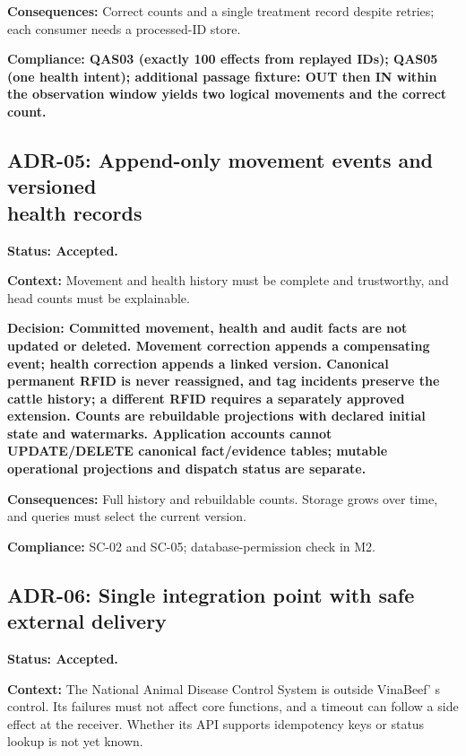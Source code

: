 \textbf{Consequences:} Correct counts and a single treatment record
despite retries; each consumer needs a processed-ID store.

\textbf{Compliance: QAS03 (exactly 100 effects from replayed IDs); QAS05
(one health intent); additional passage fixture: OUT then IN within the
observation window yields two logical movements and the correct count.}

\subsection[ADR-05: Append-only movement events and versioned health records]{ADR-05: Append-only movement events and versioned\\ health records}\label{adr:05}

\textbf{Status: Accepted.}

\textbf{Context:} Movement and health history must be complete and
trustworthy, and head counts must be explainable.

\textbf{Decision: Committed movement, health and audit facts are not
updated or deleted. Movement correction appends a compensating event;
health correction appends a linked version. Canonical permanent RFID is
never reassigned, and tag incidents preserve the cattle history; a
different RFID requires a separately approved extension. Counts are
rebuildable projections with declared initial state and watermarks.
Application accounts cannot UPDATE/DELETE canonical fact/evidence
tables; mutable operational projections and dispatch status are
separate.}

\textbf{Consequences:} Full history and rebuildable counts. Storage
grows over time, and queries must select the current version.

\textbf{Compliance:} SC-02 and SC-05; database-permission check in M2.

\subsection{ADR-06: Single integration point with safe external delivery}\label{adr:06}

\textbf{Status: Accepted.}

\textbf{Context:} The National Animal Disease Control System is outside
VinaBeef' s control. Its failures must not affect core
functions, and a timeout can follow a side effect at the receiver.
Whether its API supports idempotency keys or status lookup is not yet
known.

